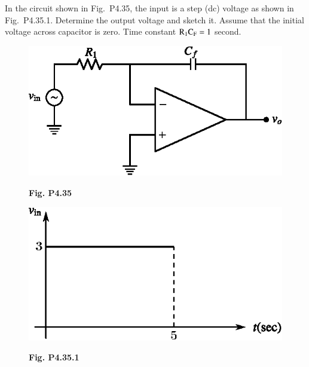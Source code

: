 \begin{problem}\label{prob4.35}
In the circuit shown in Fig.~P4.35, the input is a step (dc) voltage as shown in Fig.~P4.35.1. Determine the output voltage and sketch it. Assume that the initial voltage across capacitor is zero. Time constant $\textrm{R}_{1}\textrm{C}_{\textrm{F}}=1$ second.
\begin{figure}[H]
\centering
\includegraphics{chap4/figP4.34.eps}

\smallskip
{\bf Fig. P4.35}
\end{figure}
\begin{figure}[H]
\centering
\includegraphics{chap4/figP4.34.1.eps}

\smallskip
{\bf Fig. P4.35.1}
\end{figure}
\end{problem}


